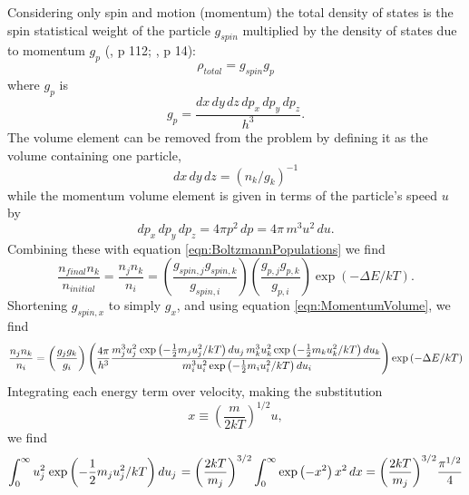 Considering only spin and motion (momentum) the total density of states
is the spin statistical weight of the particle $g_{spin}$ multiplied by the
density of states due to momentum $g_p$ (\citealp{Mihalas1978}, p 112; \citealp{Elitzur1992},
p 14):
\begin{equation}
{\rho _{total}} = {g_{spin}}{g_p}
\end{equation}
where $g_p$ is
\begin{equation}
{g_p} = \frac{{dx\,dy\,dz\,d{p_x}\,d{p_y}\,d{p_z}}}{{{h^3}}}.
\end{equation}
The volume element can be removed from the problem by defining it as the
volume containing one particle,
\begin{equation}
dx\,dy\,dz = {\left( {{n_k}/{g_k}} \right)^{ - 1}}
\end{equation}
while the momentum volume element is given in terms of the particle's speed
$u$ by
\begin{equation}
\label{eqn:MomentumVolume}
d{p_x}\,d{p_y}\,d{p_z} = 4\pi {p^2}\,dp = 4\pi \,{m^3}{u^2}\,du.
\end{equation}
Combining these with equation \ref{eqn:BoltzmannPopulations} we find
\begin{equation}
\frac{{{n_{final}}{n_k}}}{{{n_{initial}}}} = \frac{{{n_j}{n_k}}}{{{n_i}}}
= \left( {\frac{{{g_{spin,j}}{g_{spin,k}}}}{{{g_{spin,i}}}}} \right)\left(
{\frac{{{g_{p,j}}{g_{p,k}}}}{{{g_{p,i}}}}} \right)\exp \left( { - \Delta
E/kT} \right).
\end{equation}
Shortening $g_{spin,x}$ to simply $g_x$, and using equation \ref{eqn:MomentumVolume}, we find
\begin{equation}
\frac{{{n_j}{n_k}}}{{{n_i}}} = \left( {\frac{{{g_j}{g_k}}}{{{g_i}}}}
\right)\left( {\frac{{4\pi }}{{{h^3}}}\frac{{m_j^3u_j^2{\kern 1pt} \exp
\left( { - \frac{1}{2}{m_j}u_j^2/kT} \right)d{u_j}\,m_k^3u_k^2
\exp \left( { - \frac{1}{2}{m_k}u_k^2/kT} \right)d{u_k}}}{{\,m_i^3u_i^2 \exp \left( { - \frac{1}{2}{m_i}u_i^2/kT} \right)d{u_i}}}} \right)\exp \left( { - \Delta E/kT} \right)
\end{equation}
Integrating each energy term over velocity, making the substitution
\begin{equation}
x \equiv {\left( {\frac{m}{{2kT}}} \right)^{1/2}}u,
\end{equation}
we find
\begin{equation}
\int_0^\infty  {u_j^2{\kern 1pt} \exp \left( { - \frac{1}{2}{m_j}u_j^2/kT}
\right)d{u_j}{\kern 1pt} }  = {\left( {\frac{{2kT}}{{{m_j}}}}
\right)^{3/2}}\int_0^\infty  {\exp \left( { - {x^2}} \right){x^2}\,dx}
= {\left( {\frac{{2kT}}{{{m_j}}}} \right)^{3/2}}\frac{{{\pi ^{1/2}}}}{4}
\end{equation}
